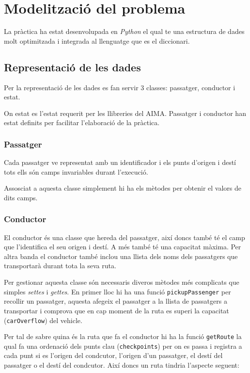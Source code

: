 \section{Modelització del problema}
La pràctica ha estat desenvolupada en \emph{Python} el qual te una estructura de dades molt optimitzada
i integrada al llenguatge que es el diccionari.

\subsection{Representació de les dades}
Per la representació de les dades es fan servir 3 classes: passatger, conductor i estat.

On estat es l'estat requerit per les llibreries del AIMA. Passatger i conductor han estat
definits per facilitar l'elaboració de la pràctica.

\subsubsection{Passatger}
Cada passatger ve representat amb un identificador i els punts d'origen i destí tots ells són
camps invariables durant l'execució.

Assosciat a aquesta classe simplement hi ha els mètodes per obtenir el valors de dits camps.

\subsubsection{Conductor}
El conductor és una classe que hereda del passatger, així doncs també té el camp que l'identifica
el seu origen i destí. A més també té una capacitat màxima.
Per altra banda el conductor també inclou una llista dels noms dels passatgers que transportarà
durant tota la seva ruta.

Per gestionar aquesta classe són necessaris diveros mètodes més complicats que simples \emph{settes} i \emph{gettes}.
En primer lloc hi ha una funció \texttt{pickupPassenger} per recollir un passatger, aquesta afegeix el passatger
a la llista de passatgers a transportar i comprova que en cap moment de la ruta es superi la capacitat
(\texttt{carOverflow}) del vehicle.

Per tal de sabre quina és la ruta que fa el conductor hi ha la funció \texttt{getRoute} la qual
fa una ordenació dels punts clau (\texttt{checkpoints}) per on es passa i registra a cada punt si es
l'origen del condcutor, l'origen d'un passatger, el destí del passatger o el destí del condcutor. Així
doncs un ruta tindria l'aspecte seguent: 


